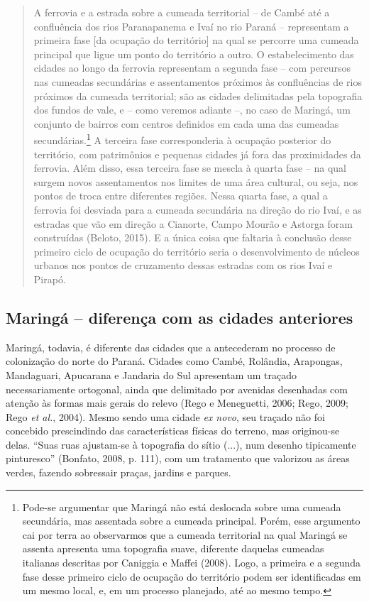 \documentclass[12pt, a4paper]{book} %
\begin{document}
        \begin{quotation}
            A ferrovia e a estrada sobre a cumeada territorial – de Cambé até a confluência dos rios Paranapanema e Ivaí no rio Paraná – representam a primeira fase [da ocupação do território] na qual se percorre uma cumeada principal que ligue um ponto do território a outro. O estabelecimento das cidades ao longo da ferrovia representam a segunda fase – com percursos nas cumeadas secundárias e assentamentos próximos às confluências de rios próximos da cumeada territorial; são as cidades delimitadas pela topografia dos fundos de vale, e – como veremos adiante –, no caso de Maringá, um conjunto de bairros com centros definidos em cada uma das cumeadas secundárias.\footnote[17]{Pode-se argumentar que Maringá não está deslocada sobre uma cumeada secundária, mas assentada sobre a cumeada principal. Porém, esse argumento cai por terra ao observarmos que a cumeada territorial na qual Maringá se assenta apresenta uma topografia suave, diferente daquelas cumeadas italianas descritas por Caniggia e Maffei (2008). Logo, a primeira e a segunda fase desse primeiro ciclo de ocupação do território podem ser identificadas em um mesmo local, e, em um processo planejado, até ao mesmo tempo.} A terceira fase corresponderia à ocupação posterior do território, com patrimônios e pequenas cidades já fora das proximidades da ferrovia. Além disso, essa terceira fase se mescla à quarta fase – na qual surgem novos assentamentos nos limites de uma área cultural, ou seja, nos pontos de troca entre diferentes regiões. Nessa quarta fase, a qual a ferrovia foi desviada para a cumeada secundária na direção do rio Ivaí, e as estradas que vão em direção a Cianorte, Campo Mourão e Astorga foram construídas (Beloto, 2015). E a única coisa que faltaria à conclusão desse primeiro ciclo de ocupação do território seria o desenvolvimento de núcleos urbanos nos pontos de cruzamento dessas estradas com os rios Ivaí e Pirapó.
        \end{quotation}

                \subsection*{Maringá – diferença com as cidades anteriores}

        
        Maringá, todavia, é diferente das cidades que a antecederam no processo de colonização do norte do Paraná. Cidades como Cambé, Rolândia, Arapongas, Mandaguari, Apucarana e Jandaria do Sul apresentam um traçado necessariamente ortogonal, ainda que delimitado por avenidas desenhadas com atenção às formas mais gerais do relevo (Rego e Meneguetti, 2006; Rego, 2009; Rego \textit{et al.}, 2004). Mesmo sendo uma cidade \textit{ex novo}, seu traçado não foi concebido prescindindo das características físicas do terreno, mas originou-se delas. ``Suas ruas ajustam-se à topografia do sítio (...), num desenho tipicamente pinturesco'' (Bonfato, 2008, p. 111), com um tratamento que valorizou as áreas verdes, fazendo sobressair praças, jardins e parques. 
        
\end{document}
